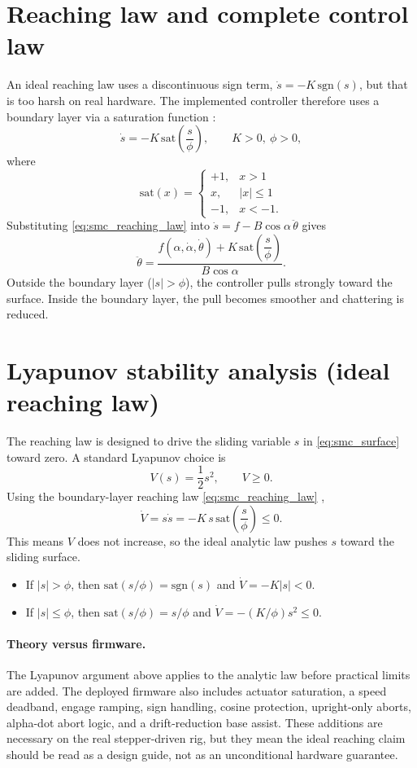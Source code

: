 \section{Reaching law and complete control law}
An ideal reaching law uses a discontinuous sign term, $\dot{s}=-K\,\mathrm{sgn}(s)$, but that is too harsh on real hardware. The implemented controller therefore uses a boundary layer via a saturation function \cite{utkin1992,slotine1991,Young1999}:
\begin{equation}
\dot{s} = -K\,\mathrm{sat}\!\left(\frac{s}{\phi}\right),\qquad K>0,\ \phi>0,
\label{eq:smc_reaching_law}
\end{equation}
where
\[
\mathrm{sat}(x)=
\begin{cases}
 +1, & x>1\\
 x, & |x|\le 1\\
 -1, & x<-1.
\end{cases}
\]
Substituting \eqref{eq:smc_reaching_law} into $\dot{s}=f-B\cos\alpha\,\ddot{\theta}$ gives
\begin{equation}
\ddot{\theta}
=
\frac{f(\alpha,\dot{\alpha},\dot{\theta}) + K\,\mathrm{sat}\!\left(\dfrac{s}{\phi}\right)}{B\cos\alpha}.
\label{eq:smc_control_law}
\end{equation}
Outside the boundary layer ($|s|>\phi$), the controller pulls strongly toward the surface. Inside the boundary layer, the pull becomes smoother and chattering is reduced.

\section{Lyapunov stability analysis (ideal reaching law)}
The reaching law is designed to drive the sliding variable $s$ in \eqref{eq:smc_surface} toward zero. A standard Lyapunov choice is
\[
V(s)=\frac{1}{2}s^2,\qquad V\ge 0.
\]
Using the boundary-layer reaching law \eqref{eq:smc_reaching_law} \cite{utkin1992,slotine1991,Young1999},
\[
\dot{V}=s\dot{s}=-K\,s\,\mathrm{sat}\!\left(\frac{s}{\phi}\right)\le 0.
\]
This means $V$ does not increase, so the ideal analytic law pushes $s$ toward the sliding surface.
\begin{itemize}
  \item If $|s|>\phi$, then $\mathrm{sat}(s/\phi)=\mathrm{sgn}(s)$ and $\dot{V}=-K|s|<0$.
  \item If $|s|\le\phi$, then $\mathrm{sat}(s/\phi)=s/\phi$ and $\dot{V}=-(K/\phi)s^2\le 0$.
\end{itemize}

\paragraph{Theory versus firmware.}
The Lyapunov argument above applies to the analytic law before practical limits are added. The deployed firmware also includes actuator saturation, a speed deadband, engage ramping, sign handling, cosine protection, upright-only aborts, alpha-dot abort logic, and a drift-reduction base assist. These additions are necessary on the real stepper-driven rig, but they mean the ideal reaching claim should be read as a design guide, not as an unconditional hardware guarantee.

